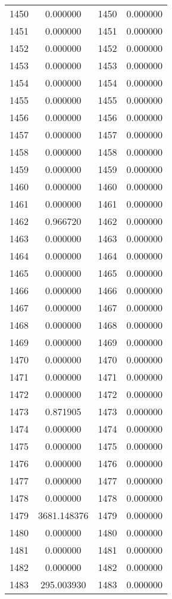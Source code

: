 \documentclass[12pt]{article}
\begin{document}
\begin{longtable}{@{}cccc@{}}
1450 & 0.000000 & 1450 & 0.000000 \\
1451 & 0.000000 & 1451 & 0.000000 \\
1452 & 0.000000 & 1452 & 0.000000 \\
1453 & 0.000000 & 1453 & 0.000000 \\
1454 & 0.000000 & 1454 & 0.000000 \\
1455 & 0.000000 & 1455 & 0.000000 \\
1456 & 0.000000 & 1456 & 0.000000 \\
1457 & 0.000000 & 1457 & 0.000000 \\
1458 & 0.000000 & 1458 & 0.000000 \\
1459 & 0.000000 & 1459 & 0.000000 \\
1460 & 0.000000 & 1460 & 0.000000 \\
1461 & 0.000000 & 1461 & 0.000000 \\
1462 & 0.966720 & 1462 & 0.000000 \\
1463 & 0.000000 & 1463 & 0.000000 \\
1464 & 0.000000 & 1464 & 0.000000 \\
1465 & 0.000000 & 1465 & 0.000000 \\
1466 & 0.000000 & 1466 & 0.000000 \\
1467 & 0.000000 & 1467 & 0.000000 \\
1468 & 0.000000 & 1468 & 0.000000 \\
1469 & 0.000000 & 1469 & 0.000000 \\
1470 & 0.000000 & 1470 & 0.000000 \\
1471 & 0.000000 & 1471 & 0.000000 \\
1472 & 0.000000 & 1472 & 0.000000 \\
1473 & 0.871905 & 1473 & 0.000000 \\
1474 & 0.000000 & 1474 & 0.000000 \\
1475 & 0.000000 & 1475 & 0.000000 \\
1476 & 0.000000 & 1476 & 0.000000 \\
1477 & 0.000000 & 1477 & 0.000000 \\
1478 & 0.000000 & 1478 & 0.000000 \\
1479 & 3681.148376 & 1479 & 0.000000 \\
1480 & 0.000000 & 1480 & 0.000000 \\
1481 & 0.000000 & 1481 & 0.000000 \\
1482 & 0.000000 & 1482 & 0.000000 \\
1483 & 295.003930 & 1483 & 0.000000 \\

\end{longtable}
\end{document}
